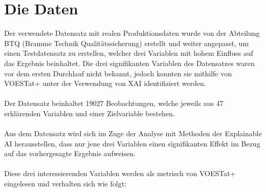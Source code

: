 \documentclass[12pt,titlepage,oneside]{book}
\begin{document}
\section{Die Daten}
Der verwendete Datensatz mit realen Produktionsdaten wurde von der Abteilung BTQ (Bramme Technik Qualitätssicherung) erstellt und weiter angepasst, um einen Testdatensatz zu erstellen, welcher drei Variablen mit hohem Einfluss auf das Ergebnis beinhaltet. Die drei signifikanten Variablen des Datensatzes waren vor dem ersten Durchlauf nicht bekannt, jedoch konnten sie mithilfe von VOESTat+ unter der Verwendung von XAI identifiziert werden. \\ \\
Der Datensatz beinhaltet 19027 Beobachtungen, welche jeweils aus 47 erklärenden Variablen und einer Zielvariable bestehen. \\ \\
Aus dem Datensatz wird sich im Zuge der Analyse mit Methoden der Explainable AI herausstellen, dass nur jene drei Variablen einen signifikanten Effekt im Bezug auf das vorhergesagte Ergebnis aufweisen.\\ \\
Diese drei interessierenden Variablen werden als metrisch von VOESTat+ eingelesen und verhalten sich wie folgt:
\newpage
\end{document}
